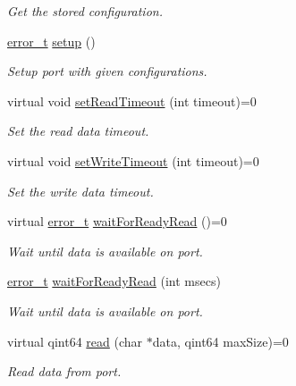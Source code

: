 \begin{DoxyCompactItemize}
\begin{DoxyCompactList}\small\item\em Get the stored configuration. \end{DoxyCompactList}\item 
\hyperlink{classmdt_abstract_port_ad4121bb930c95887e77f8bafa065a85e}{error\_\-t} \hyperlink{classmdt_abstract_port_abc9f1154ac71c4e31ac3e7a3ff4c5182}{setup} ()
\begin{DoxyCompactList}\small\item\em Setup port with given configurations. \end{DoxyCompactList}\item 
virtual void \hyperlink{classmdt_abstract_port_a6589b04467e0073d18ba872201bdcd84}{setReadTimeout} (int timeout)=0
\begin{DoxyCompactList}\small\item\em Set the read data timeout. \end{DoxyCompactList}\item 
virtual void \hyperlink{classmdt_abstract_port_a12eb422d52ebb09a650f8497b258c2e7}{setWriteTimeout} (int timeout)=0
\begin{DoxyCompactList}\small\item\em Set the write data timeout. \end{DoxyCompactList}\item 
virtual \hyperlink{classmdt_abstract_port_ad4121bb930c95887e77f8bafa065a85e}{error\_\-t} \hyperlink{classmdt_abstract_port_aeda364cb191da1038a22dd1fc06a1d49}{waitForReadyRead} ()=0
\begin{DoxyCompactList}\small\item\em Wait until data is available on port. \end{DoxyCompactList}\item 
\hyperlink{classmdt_abstract_port_ad4121bb930c95887e77f8bafa065a85e}{error\_\-t} \hyperlink{classmdt_abstract_port_a47f4db2e72b5fd3e32162e6a898fd391}{waitForReadyRead} (int msecs)
\begin{DoxyCompactList}\small\item\em Wait until data is available on port. \end{DoxyCompactList}\item 
virtual qint64 \hyperlink{classmdt_abstract_port_a9d9c45220d5328c9856a2445557fe970}{read} (char $\ast$data, qint64 maxSize)=0
\begin{DoxyCompactList}\small\item\em Read data from port. \end{DoxyCompactList}\item 

\end{DoxyCompactItemize}
